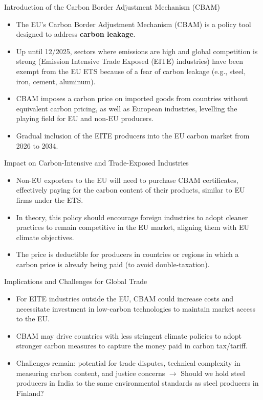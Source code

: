 \documentclass{beamer}
\begin{document}
\begin{frame}{Introduction of the Carbon Border Adjustment Mechanism (CBAM)}
    \begin{itemize} \small
        \item The EU's Carbon Border Adjustment Mechanism (CBAM) is a policy tool designed to address \textbf{carbon leakage}.
        \item Up until 12/2025, sectors where emissions are high and global competition is strong (Emission Intensive Trade Exposed (EITE) industries) have been exempt from the EU ETS because of a fear of carbon leakage (e.g., steel, iron, cement, aluminum).
        \item CBAM imposes a carbon price on imported goods from countries without equivalent carbon pricing, as well as European industries, levelling the playing field for EU and non-EU producers.
        \item Gradual inclusion of the EITE producers into the EU carbon market from 2026 to 2034.
    \end{itemize}
\end{frame}

\begin{frame}{Impact on Carbon-Intensive and Trade-Exposed Industries}
    \begin{itemize}
        \item Non-EU exporters to the EU will need to purchase CBAM certificates, effectively paying for the carbon content of their products, similar to EU firms under the ETS.
        \item In theory, this policy should encourage foreign industries to adopt cleaner practices to remain competitive in the EU market, aligning them with EU climate objectives.
        \item The price is deductible for producers in countries or regions in which a carbon price is already being paid (to avoid double-taxation).
    \end{itemize}
\end{frame}

\begin{frame}{Implications and Challenges for Global Trade}
    \begin{itemize}
        \item For EITE industries outside the EU, CBAM could increase costs and necessitate investment in low-carbon technologies to maintain market access to the EU.
        \item CBAM may drive countries with less stringent climate policies to adopt stronger carbon measures to capture the money paid in carbon tax/tariff. %
        \item Challenges remain: potential for trade disputes, technical complexity in measuring carbon content, and justice concerns $\rightarrow$ Should we hold steel producers in India to the same environmental standards as steel producers in Finland?
    \end{itemize}
\end{frame}
\end{document}

